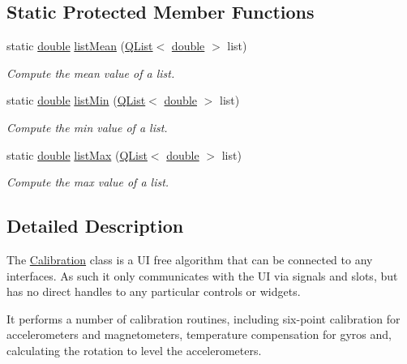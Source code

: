 \subsection*{Static Protected Member Functions}
\begin{DoxyCompactItemize}
\item 
static \hyperlink{_super_l_u_support_8h_a8956b2b9f49bf918deed98379d159ca7}{double} \hyperlink{class_calibration_a95498e971c84717dd7aec18af86e008d}{list\-Mean} (\hyperlink{class_q_list}{Q\-List}$<$ \hyperlink{_super_l_u_support_8h_a8956b2b9f49bf918deed98379d159ca7}{double} $>$ list)
\begin{DoxyCompactList}\small\item\em Compute the mean value of a list. \end{DoxyCompactList}\item 
static \hyperlink{_super_l_u_support_8h_a8956b2b9f49bf918deed98379d159ca7}{double} \hyperlink{class_calibration_a5eb9cfb2ba5165de6feea8dc94152d49}{list\-Min} (\hyperlink{class_q_list}{Q\-List}$<$ \hyperlink{_super_l_u_support_8h_a8956b2b9f49bf918deed98379d159ca7}{double} $>$ list)
\begin{DoxyCompactList}\small\item\em Compute the min value of a list. \end{DoxyCompactList}\item 
static \hyperlink{_super_l_u_support_8h_a8956b2b9f49bf918deed98379d159ca7}{double} \hyperlink{class_calibration_a635535616022d0ffb41e1a9235d52787}{list\-Max} (\hyperlink{class_q_list}{Q\-List}$<$ \hyperlink{_super_l_u_support_8h_a8956b2b9f49bf918deed98379d159ca7}{double} $>$ list)
\begin{DoxyCompactList}\small\item\em Compute the max value of a list. \end{DoxyCompactList}\end{DoxyCompactItemize}


\subsection{Detailed Description}
The \hyperlink{class_calibration}{Calibration} class is a U\-I free algorithm that can be connected to any interfaces. As such it only communicates with the U\-I via signals and slots, but has no direct handles to any particular controls or widgets. 

It performs a number of calibration routines, including six-\/point calibration for accelerometers and magnetometers, temperature compensation for gyros and, calculating the rotation to level the accelerometers. 

